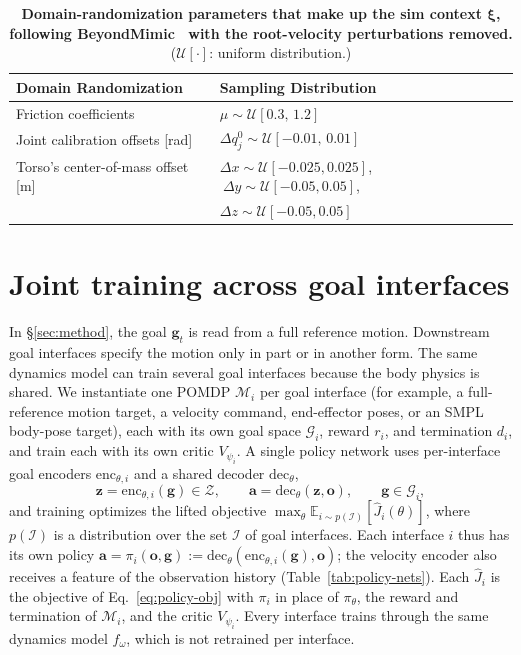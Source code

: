 \begin{table}[t]
\centering
\begin{tabular}{ll}
\toprule
\textbf{Domain Randomization} & \textbf{Sampling Distribution} \\
\midrule
Friction coefficients & $\mu \sim \mathcal{U}[0.3,\,1.2]$ \\
Joint calibration offsets [rad] & $ \Delta q^0_j \!\sim  \mathcal{U}[-0.01,\,0.01] $\\
Torso's center-of-mass offset [m]& $\Delta x\!\sim\!\mathcal{U}[-0.025,0.025]$,  $\ \Delta y\!\sim\!\mathcal{U}[-0.05,0.05]$, \\ &$ \Delta z\!\sim\!\mathcal{U}[-0.05,0.05]$ \\
\bottomrule
\end{tabular}
\vspace{0.6em}
\caption{\textbf{Domain-randomization parameters that make up the sim context $\bm{\xi}$, following BeyondMimic~\citep{liao2025beyondmimic} with the root-velocity perturbations removed.} ($\mathcal{U}[\cdot]$: uniform distribution.)}
\label{tab:domain-rand-supermimic}
\end{table}

\section{Joint training across goal interfaces}
\label{app:unified}
In \S\ref{sec:method}, the goal $\bm{g}_t$ is read from a full reference motion. Downstream goal interfaces specify the motion only in part or in another form. The same dynamics model can train several goal interfaces because the body physics is shared. We instantiate one POMDP $\mathcal{M}_i$ per goal interface (for example, a full-reference motion target, a velocity command, end-effector poses, or an SMPL body-pose target), each with its own goal space $\mathcal{G}_i$, reward $r_i$, and termination $d_i$, and train each with its own critic $V_{\psi_i}$. A single policy network uses per-interface goal encoders $\mathrm{enc}_{\theta,i}$ and a shared decoder $\mathrm{dec}_\theta$,
\begin{equation}
  \bm{z} = \mathrm{enc}_{\theta,i}(\bm{g}) \in \mathcal{Z}, \qquad \bm{a} = \mathrm{dec}_\theta(\bm{z}, \bm{o}), \qquad \bm{g} \in \mathcal{G}_i,
\end{equation}
and training optimizes the lifted objective $\max_\theta \mathbb{E}_{i\sim p(\mathcal{I})}[\hat{J}_i(\theta)]$, where $p(\mathcal{I})$ is a distribution over the set $\mathcal{I}$ of goal interfaces. Each interface $i$ thus has its own policy $\bm{a} = \pi_i(\bm{o}, \bm{g}) := \mathrm{dec}_\theta(\mathrm{enc}_{\theta,i}(\bm{g}), \bm{o})$; the velocity encoder also receives a feature of the observation history (Table~\ref{tab:policy-nets}). Each $\hat{J}_i$ is the objective of Eq.~\ref{eq:policy-obj} with $\pi_i$ in place of $\pi_\theta$, the reward and termination of $\mathcal{M}_i$, and the critic $V_{\psi_i}$. Every interface trains through the same dynamics model $f_\omega$, which is not retrained per interface.

